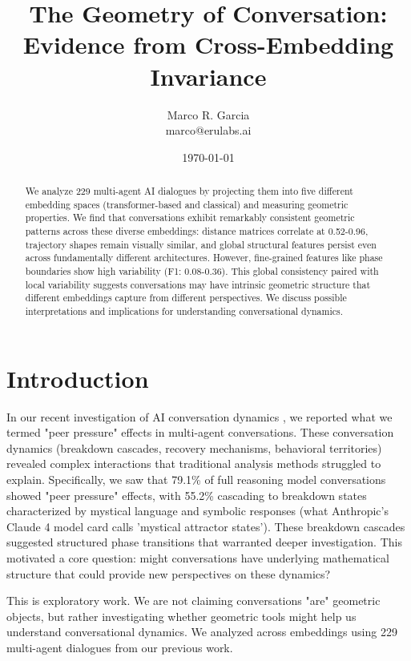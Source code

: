 \documentclass[11pt,letterpaper]{article}
\title{The Geometry of Conversation: Evidence from Cross-Embedding Invariance}
\author{
Marco R. Garcia \\
marco@erulabs.ai
}
\date{\today}
\newcommand{\totalConversations}{229}
\begin{document}
\maketitle

\begin{abstract}
We analyze \totalConversations{} multi-agent AI dialogues by projecting them into five different embedding spaces (transformer-based and classical) and measuring geometric properties. We find that conversations exhibit remarkably consistent geometric patterns across these diverse embeddings: distance matrices correlate at 0.52-0.96, trajectory shapes remain visually similar, and global structural features persist even across fundamentally different architectures. However, fine-grained features like phase boundaries show high variability (F1: 0.08-0.36). This global consistency paired with local variability suggests conversations may have intrinsic geometric structure that different embeddings capture from different perspectives. We discuss possible interpretations and implications for understanding conversational dynamics.
\end{abstract}

\section{Introduction}

In our recent investigation of AI conversation dynamics \citep{garcia2025peer}, we reported what we termed "peer pressure" effects in multi-agent conversations. These conversation dynamics (breakdown cascades, recovery mechanisms, behavioral territories) revealed complex interactions that traditional analysis methods struggled to explain. Specifically, we saw that 79.1\% of full reasoning model conversations showed "peer pressure" effects, with 55.2\% cascading to breakdown states characterized by mystical language and symbolic responses (what Anthropic's Claude 4 model card calls 'mystical attractor states'). These breakdown cascades suggested structured phase transitions that warranted deeper investigation. This motivated a core question: might conversations have underlying mathematical structure that could provide new perspectives on these dynamics? 

This is exploratory work. We are not claiming conversations "are" geometric objects, but rather investigating whether geometric tools might help us understand conversational dynamics. We analyzed across embeddings using \totalConversations{} multi-agent dialogues from our previous work. 
\end{document}
